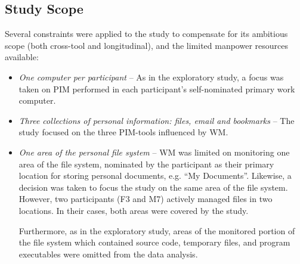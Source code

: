 \subsection{Study Scope}
\label{main-study:method-scope}
Several constraints were applied to the study to compensate for its ambitious scope (both cross-tool and longitudinal), and the limited manpower resources available:
\begin{itemize}

\item \textit{One computer per participant } -- As in the exploratory study, a focus was taken on PIM performed in each participant's self-nominated primary work computer.


\item \textit{Three collections of personal information: files, email and bookmarks} -- The study focused on the three PIM-tools influenced by WM.  

\item \textit{One area of the personal file system} -- WM was limited on monitoring one area of the file system, nominated by the participant as their primary location for storing personal documents, e.g. ``My Documents''.  Likewise, a decision was taken to focus the study on the same area of the file system.  However, 
two participants (F3 and M7) actively managed files in two locations.  In their cases, both areas were covered by the study.

Furthermore, as in the exploratory study, areas of the monitored portion of the file system which contained source code, temporary files, and program executables were omitted from the data analysis.  

\end{itemize}




